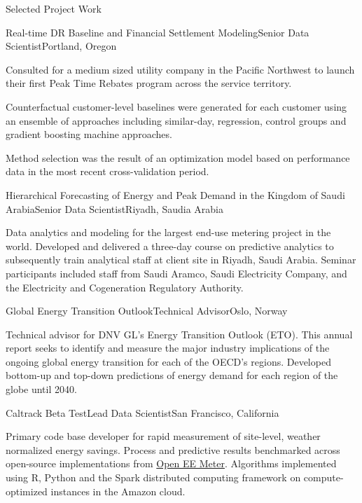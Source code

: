 \documentclass{resume} %
\begin{document}
\begin{rSection}{Selected Project Work}
\begin{rSubsection}{Real-time DR Baseline and Financial Settlement Modeling}{}{Senior Data Scientist}{Portland, Oregon}
\item[] Consulted for a medium sized utility company in the Pacific Northwest to launch their first
Peak Time Rebates program across the service territory.
\item[] Counterfactual customer-level baselines were generated for each customer using an ensemble of approaches including similar-day, regression, control groups and gradient boosting machine approaches.
\item[] Method selection was the result of an optimization model based on performance data in the most recent cross-validation period.
\end{rSubsection}

\begin{rSubsection}{Hierarchical Forecasting of Energy and Peak Demand in the Kingdom of Saudi Arabia}{}{Senior Data Scientist}{Riyadh, Saudia Arabia}
\item[] Data analytics and modeling for the largest end-use metering project in the world. Developed and delivered a three-day course on predictive analytics to subsequently train analytical staff at client site in Riyadh, Saudi Arabia. Seminar participants included staff from Saudi Aramco, Saudi Electricity Company, and the Electricity and Cogeneration Regulatory Authority.

\end{rSubsection}

\pagebreak

\begin{rSubsection}{Global Energy Transition Outlook}{}{Technical Advisor}{Oslo, Norway}
\item[] Technical advisor for DNV GL's Energy Transition Outlook (ETO). This annual report seeks to identify and measure the major industry implications of the ongoing global energy transition for each of the OECD's regions. Developed bottom-up and top-down predictions of energy demand for each region of the globe until 2040.
\end{rSubsection}

\begin{rSubsection}{Caltrack Beta Test}{}{Lead Data Scientist}{San Francisco, California}
\item[] Primary code base developer for rapid measurement of site-level, weather normalized energy savings. Process and predictive results benchmarked across open-source implementations from \href{https://github.com/impactlab/caltrack}{Open EE Meter}. Algorithms implemented using R, Python and the Spark distributed computing framework on compute-optimized instances in the Amazon cloud.
\end{rSubsection}


\end{rSection}
\end{document}
